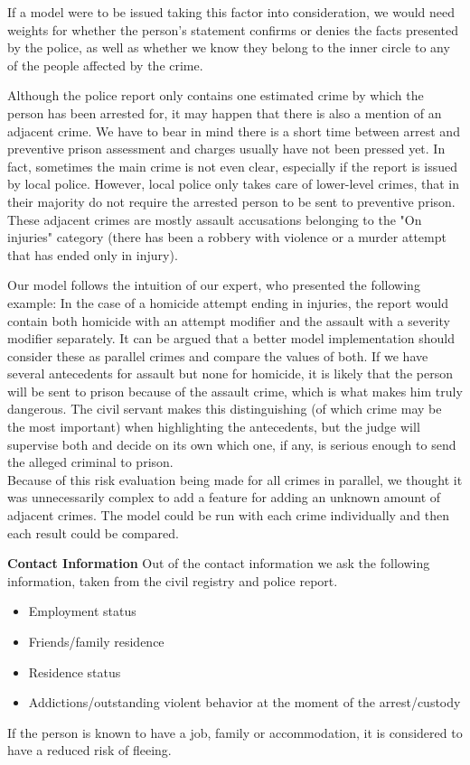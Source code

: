 \documentclass{article}
\begin{document}
If a model were to be issued taking this factor into consideration, we would need weights for whether the person's statement confirms or denies the facts presented by the police, as well as whether we know they belong to the inner circle to any of the people affected by the crime. 

Although the police report only contains one estimated crime by which the person has been arrested for, it may happen that there is also a mention of an adjacent crime. We have to bear in mind there is a short time between arrest and preventive prison assessment and charges usually have not been pressed yet. In fact, sometimes the main crime is not even clear, especially if the report is issued by local police. However, local police only takes care of lower-level crimes, that in their majority do not require the arrested person to be sent to preventive prison. \\
These adjacent crimes are mostly assault accusations belonging to the "On injuries" category (there has been a robbery with violence or a murder attempt that has ended only in injury). 

Our model follows the intuition of our expert, who presented the following example:
In the case of a homicide attempt ending in injuries, the report would contain both homicide with an attempt modifier and the assault with a severity modifier separately.
It can be argued that a better model implementation should consider these as parallel crimes and compare the values of both. If we have several antecedents for assault but none for homicide, it is likely that the person will be sent to prison because of the assault crime, which is what makes him truly dangerous. The civil servant makes this distinguishing (of which crime may be the most important) when highlighting the antecedents, but the judge will supervise both and decide on its own which one, if any, is serious enough to send the alleged criminal to prison. \\
Because of this risk evaluation being made for all crimes in parallel, we thought it was unnecessarily complex to add a feature for adding an unknown amount of adjacent crimes. The model could be run with each crime individually and then each result could be compared. 

\textbf{Contact Information} Out of the contact information we ask the following information, taken from the civil registry and police report.
\begin{itemize}
    \item Employment status
    \item Friends/family residence
    \item Residence status
    \item Addictions/outstanding violent behavior at the moment of the arrest/custody
\end{itemize}
If the person is known to have a job, family or accommodation, it is considered to have a reduced risk of fleeing.
\end{document}
